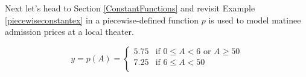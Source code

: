 \documentclass{ximera}
\begin{document}
\begin{image}

\end{image}

 Next let's head to Section \ref{ConstantFunctions} and revisit Example \ref{piecewiseconstantex} in a piecewise-defined function $p$ is used to model matinee admission prices at a local theater.
    
$$y = p(A) = \begin{cases} 
      5.75 &  \text{if $0 \leq A < 6$ or $A \geq 50$} \\
      7.25  & \text{if $6 \leq A < 50$} \\
   \end{cases}$$
\end{document}
